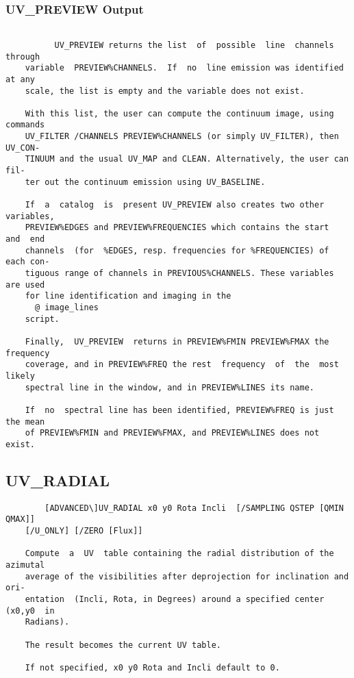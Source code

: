 \subsubsection{UV\_PREVIEW Output}
\begin{verbatim}

          UV_PREVIEW returns the list  of  possible  line  channels  through
    variable  PREVIEW%CHANNELS.  If  no  line emission was identified at any
    scale, the list is empty and the variable does not exist.

    With this list, the user can compute the continuum image, using commands
    UV_FILTER /CHANNELS PREVIEW%CHANNELS (or simply UV_FILTER), then UV_CON-
    TINUUM and the usual UV_MAP and CLEAN. Alternatively, the user can  fil-
    ter out the continuum emission using UV_BASELINE.

    If  a  catalog  is  present UV_PREVIEW also creates two other variables,
    PREVIEW%EDGES and PREVIEW%FREQUENCIES which contains the start  and  end
    channels  (for  %EDGES, resp. frequencies for %FREQUENCIES) of each con-
    tiguous range of channels in PREVIOUS%CHANNELS. These variables are used
    for line identification and imaging in the
      @ image_lines
    script.

    Finally,  UV_PREVIEW  returns in PREVIEW%FMIN PREVIEW%FMAX the frequency
    coverage, and in PREVIEW%FREQ the rest  frequency  of  the  most  likely
    spectral line in the window, and in PREVIEW%LINES its name.

    If  no  spectral line has been identified, PREVIEW%FREQ is just the mean
    of PREVIEW%FMIN and PREVIEW%FMAX, and PREVIEW%LINES does not exist.

\end{verbatim}
\subsection{UV\_RADIAL}
\begin{verbatim}
        [ADVANCED\]UV_RADIAL x0 y0 Rota Incli  [/SAMPLING QSTEP [QMIN QMAX]]
    [/U_ONLY] [/ZERO [Flux]]

    Compute  a  UV  table containing the radial distribution of the azimutal
    average of the visibilities after deprojection for inclination and  ori-
    entation  (Incli, Rota, in Degrees) around a specified center (x0,y0  in
    Radians).

    The result becomes the current UV table.

    If not specified, x0 y0 Rota and Incli default to 0.

\end{verbatim}

